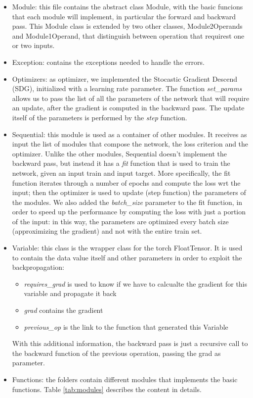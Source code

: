 \documentclass[10pt,conference,compsocconf]{IEEEtran}
\begin{document}
\begin{itemize}
	\item Module: this file contains the abstract class Module, with the basic funcions that each module will implement, in particular the forward and backward pass. This Module class is extended by two other classes, Module2Operands and Module1Operand, that distinguish between operation that requirest one or two inputs. 
	
	\item Exception: contains the exceptions needed to handle the errors.
	
	\item Optimizers: as optimizer, we implemented the Stocastic Gradient Descend (SDG), initialized with a learning rate parameter. The function \textit{set\_params} allows us to pass the list of all the parameters of the network that will require an update, after the gradient is computed in the backward pass. The update itself of the parameters is performed by the \textit{step} function.
	
	\item Sequential: this module is used as a container of other modules. It receives as input the list of modules that compose the network, the loss criterion and the optimizer. Unlike the other modules, Sequential doesn't implement the backward pass, but instead it has a \textit{fit} function that is used to train the network, given an input train and input target. More specifically, the fit function iterates through a number of epochs and compute the loss wrt the input; then the optimizer is used to update (step function) the parameters of the modules. We also added the \textit{batch\_size} parameter to the fit function, in order to speed up the performance by computing the loss with just a portion of the input: in this way, the parameters are optimized every batch size (approximizing the gradient) and not with the entire train set.
	
	\item Variable: this class is the wrapper class for the torch FloatTensor. It is used to contain the data value itself and other parameters in order to exploit the backpropagation:
	\begin{itemize}
		\item \textit{requires\_grad} is used to know if we have to calcualte the gradient for this variable and propagate it back
		\item \textit{grad} contains the gradient
		\item \textit{previous\_op} is the link to the function that generated this Variable
	\end{itemize}
	With this additional information, the backward pass is just a recursive call to the backward function of the previous operation, passing the grad as parameter. 
	
	\item Functions: the folders contain different modules that implements the basic functions. Table \ref{tab:modules} describes the content in details.
\end{itemize}
\end{document}
